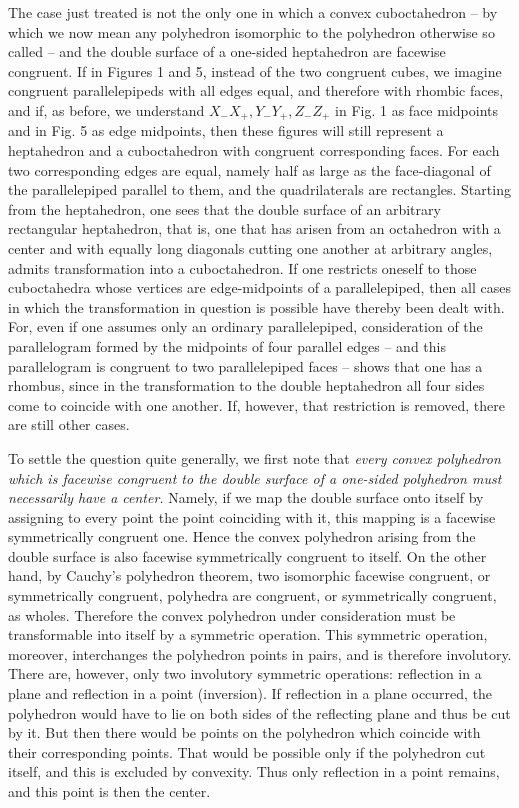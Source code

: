 \documentclass[11pt,a4paper]{article}
\begin{document}
The case just treated is not the only one in which a convex cuboctahedron -- by which we now mean any polyhedron isomorphic to the polyhedron otherwise so called -- and the double surface of a one-sided heptahedron are facewise congruent. If in Figures 1 and 5, instead of the two congruent cubes, we imagine congruent parallelepipeds with all edges equal, and therefore with rhombic faces, and if, as before, we understand $X_-X_+,Y_-Y_+,Z_-Z_+$ in Fig. 1 as face midpoints and in Fig. 5 as edge midpoints, then these figures will still represent a heptahedron and a cuboctahedron with congruent corresponding faces. For each two corresponding edges are equal, namely half as large as the face-diagonal of the parallelepiped parallel to them, and the quadrilaterals are rectangles. Starting from the heptahedron, one sees that the double surface of an arbitrary rectangular heptahedron, that is, one that has arisen from an octahedron with a center and with equally long diagonals cutting one another at arbitrary angles, admits transformation into a cuboctahedron. If one restricts oneself to those cuboctahedra whose vertices are edge-midpoints of a parallelepiped, then all cases in which the transformation in question is possible have thereby been dealt with. For, even if one assumes only an ordinary parallelepiped, consideration of the parallelogram formed by the midpoints of four parallel edges -- and this parallelogram is congruent to two parallelepiped faces -- shows that one has a rhombus, since in the transformation to the double heptahedron all four sides come to coincide with one another. If, however, that restriction is removed, there are still other cases.

To settle the question quite generally, we first note that \emph{every convex polyhedron which is facewise congruent to the double surface of a one-sided polyhedron must necessarily have a center.} Namely, if we map the double surface onto itself by assigning to every point the point coinciding with it, this mapping is a facewise symmetrically congruent one. Hence the convex polyhedron arising from the double surface is also facewise symmetrically congruent to itself. On the other hand, by Cauchy's polyhedron theorem, two isomorphic facewise congruent, or symmetrically congruent, polyhedra are congruent, or symmetrically congruent, as wholes. Therefore the convex polyhedron under consideration must be transformable into itself by a symmetric operation. This symmetric operation, moreover, interchanges the polyhedron points in pairs, and is therefore involutory. There are, however, only two involutory symmetric operations: reflection in a plane and reflection in a point (inversion). If reflection in a plane occurred, the polyhedron would have to lie on both sides of the reflecting plane and thus be cut by it. But then there would be points on the polyhedron which coincide with their corresponding points. That would be possible only if the polyhedron cut itself, and this is excluded by convexity. Thus only reflection in a point remains, and this point is then the center.
\end{document}
